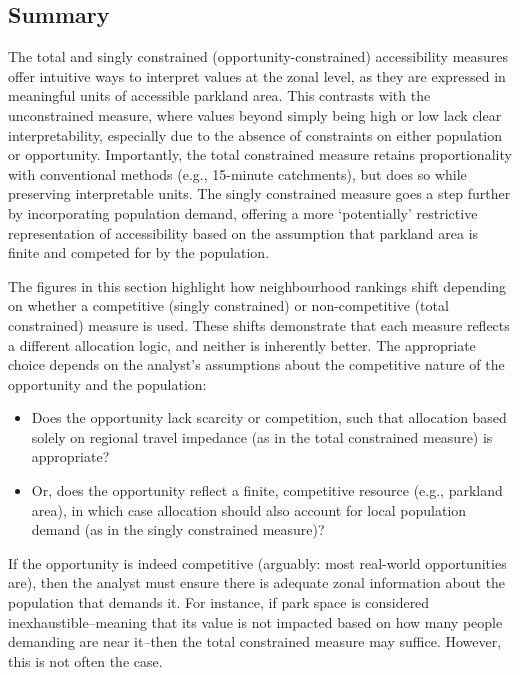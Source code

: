 \documentclass[
11pt, %
oneside, %
english, %
singlespacing, %
]{macthesis} %
\def\tightlist{}
\begin{document}
\subsection{Summary}\label{summary}

The total and singly constrained (opportunity-constrained) accessibility measures offer intuitive ways to interpret values at the zonal level, as they are expressed in meaningful units of accessible parkland area. This contrasts with the unconstrained measure, where values beyond simply being high or low lack clear interpretability, especially due to the absence of constraints on either population or opportunity. Importantly, the total constrained measure retains proportionality with conventional methods (e.g., 15-minute catchments), but does so while preserving interpretable units. The singly constrained measure goes a step further by incorporating population demand, offering a more `potentially' restrictive representation of accessibility based on the assumption that parkland area is finite and competed for by the population.

The figures in this section highlight how neighbourhood rankings shift depending on whether a competitive (singly constrained) or non-competitive (total constrained) measure is used. These shifts demonstrate that each measure reflects a different allocation logic, and neither is inherently better. The appropriate choice depends on the analyst's assumptions about the competitive nature of the opportunity and the population:

\begin{itemize}
\tightlist
\item
  Does the opportunity lack scarcity or competition, such that allocation based solely on regional travel impedance (as in the total constrained measure) is appropriate?
\item
  Or, does the opportunity reflect a finite, competitive resource (e.g., parkland area), in which case allocation should also account for local population demand (as in the singly constrained measure)?
\end{itemize}

If the opportunity is indeed competitive (arguably: most real-world opportunities are), then the analyst must ensure there is adequate zonal information about the population that demands it. For instance, if park space is considered inexhaustible--meaning that its value is not impacted based on how many people demanding are near it--then the total constrained measure may suffice. However, this is not often the case.
\end{document}
